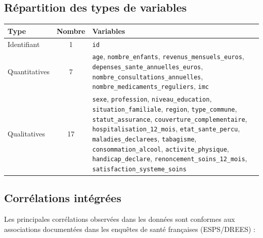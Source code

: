 \documentclass[11pt,a4paper]{memoirerecherche}
\begin{document}
\hypertarget{ruxe9partition-des-types-de-variables}{%
\subsection*{Répartition des types de variables}\label{ruxe9partition-des-types-de-variables}}

\begin{tabular}{@{} l c p{11cm} @{}}
\toprule
\textbf{Type} & \textbf{Nombre} & \textbf{Variables} \\
\midrule
Identifiant   & 1  & \texttt{id} \\
Quantitatives & 7  & \texttt{age}, \texttt{nombre\_enfants}, \texttt{revenus\_mensuels\_euros}, \texttt{depenses\_sante\_annuelles\_euros}, \texttt{nombre\_consultations\_annuelles}, \texttt{nombre\_medicaments\_reguliers}, \texttt{imc} \\
Qualitatives  & 17 & \texttt{sexe}, \texttt{profession}, \texttt{niveau\_education}, \texttt{situation\_familiale}, \texttt{region}, \texttt{type\_commune}, \texttt{statut\_assurance}, \texttt{couverture\_complementaire}, \texttt{hospitalisation\_12\_mois}, \texttt{etat\_sante\_percu}, \texttt{maladies\_declarees}, \texttt{tabagisme}, \texttt{consommation\_alcool}, \texttt{activite\_physique}, \texttt{handicap\_declare}, \texttt{renoncement\_soins\_12\_mois}, \texttt{satisfaction\_systeme\_soins} \\
\bottomrule
\end{tabular}

\hypertarget{corruxe9lations-intuxe9gruxe9es}{%
\subsection*{Corrélations intégrées}\label{corruxe9lations-intuxe9gruxe9es}}

Les principales corrélations observées dans les données sont conformes aux associations documentées dans les enquêtes de santé françaises (ESPS/DREES) :
\end{document}
